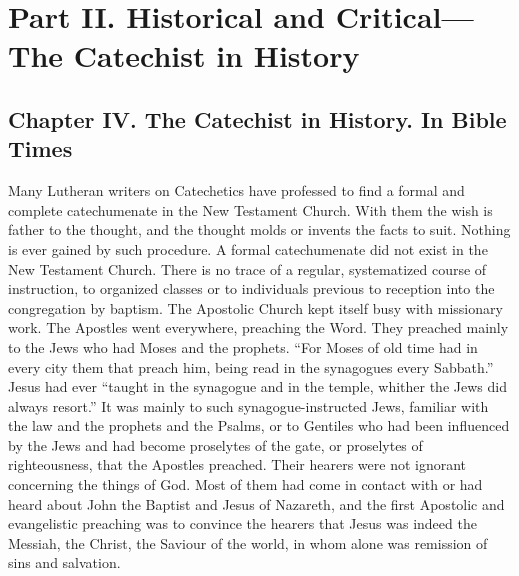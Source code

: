 \part[Part II. The Catechist in History]{Part II. Historical and Critical—The Catechist in History}

\chapter[Chapter IV. The Catechist in Bible Times]{Chapter IV. The Catechist in History. In Bible Times}

Many Lutheran writers on Catechetics have professed to find a formal and complete catechumenate in the New Testament Church. With them the wish is father to the thought, and the thought molds or invents the facts to suit. Nothing is ever gained by such procedure. A formal catechumenate did not exist in the New Testament Church. There is no trace of a regular, systematized course of instruction, to organized classes or to individuals previous to reception into the congregation by baptism. The Apostolic Church kept itself busy with missionary work. The Apostles went everywhere, preaching the Word. They preached mainly to the Jews who had Moses and the prophets. “For Moses of old time had in every city them that preach him, being read in the synagogues every Sabbath.” Jesus had ever “taught in the synagogue and in the temple, whither the Jews did always resort.” It was mainly to such synagogue-instructed Jews, familiar with the law and the prophets and the Psalms, or to Gentiles who had been influenced by the Jews and had become proselytes of the gate, or proselytes of righteousness, that the Apostles preached. Their hearers
were not ignorant concerning the things of God. Most of them had come in contact with or had heard about John the Baptist and Jesus of Nazareth, and the first Apostolic and evangelistic preaching was to convince the hearers that Jesus was indeed the Messiah, the Christ, the Saviour of the world, in whom alone was remission of sins and salvation.

